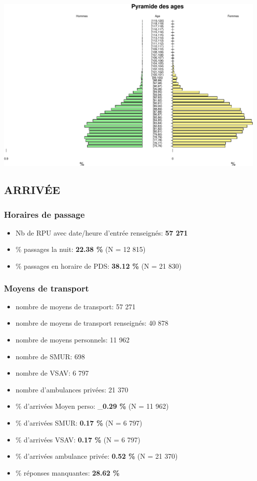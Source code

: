 \documentclass[]{article}
\begin{document}
\includegraphics{Figs/unnamed-chunk-11-1.pdf}

\subsection{ARRIVÉE}\label{arrivee-1}

\subsubsection{Horaires de passage}\label{horaires-de-passage-1}

\begin{itemize}
\itemsep1pt\parskip0pt
\item
  Nb de RPU avec date/heure d'entrée renseignés: \textbf{57 271}
\item
  \% passages la nuit: \textbf{22.38 \%} (N = 12 815)
\item
  \% passages en horaire de PDS: \textbf{38.12 \%} (N = 21 830)
\end{itemize}

\subsubsection{Moyens de transport}\label{moyens-de-transport}

\begin{itemize}
\item
  nombre de moyens de transport: 57 271
\item
  nombre de moyens de transport renseignés: 40 878
\item
  nombre de moyens personnels: 11 962
\item
  nombre de SMUR: 698
\item
  nombre de VSAV: 6 797
\item
  nombre d'ambulances privées: 21 370
\item
  \% d'arrivées Moyen perso: \_\textbf{0.29 \%} (N = 11 962)
\item
  \% d'arrivées SMUR: \textbf{0.17 \%} (N = 6 797)
\item
  \% d'arrivées VSAV: \textbf{0.17 \%} (N = 6 797)
\item
  \% d'arrivées ambulance privée: \textbf{0.52 \%} (N = 21 370)
\item
  \% réponses manquantes: \textbf{28.62 \%}
\end{itemize}
\end{document}
